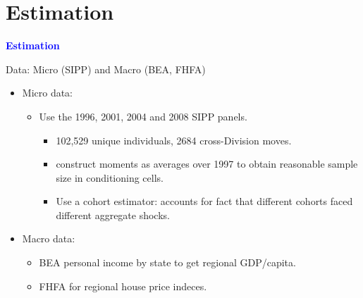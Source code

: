 \documentclass[12pt,english, aspectratio=169]{beamer}
\begin{document}
\section{Estimation}
\begin{frame}[plain]{}

\vspace{1cm}

\begin{center}
\textbf{\textcolor{blue}{\LARGE{}Estimation}}{\LARGE\par}
\par\end{center}

\end{frame}

\begin{frame}{Data: Micro (SIPP) and Macro (BEA, FHFA)}

\begin{itemize}
\item Micro data:

\begin{itemize}
\item Use the 1996, 2001, 2004 and 2008 SIPP panels.
\begin{itemize}
\item 102,529 unique individuals, 2684 cross-Division moves.
\item construct moments as averages over 1997 to obtain
reasonable sample size in conditioning cells.
\item Use a cohort estimator: accounts for fact that different cohorts faced
different aggregate shocks. 
\end{itemize}
\end{itemize}
\item Macro data:

\begin{itemize}
\item BEA personal income by state to get regional GDP/capita.
\item FHFA for regional house price indeces.
\end{itemize}
\end{itemize}
\end{frame}
\end{document}
